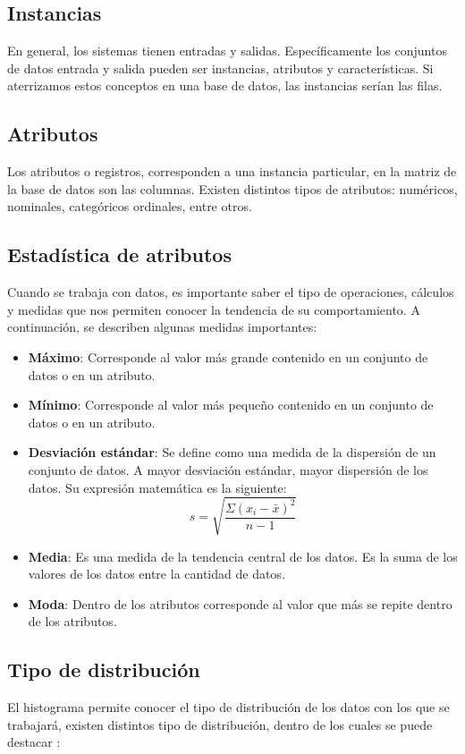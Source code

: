 \subsection{Instancias}
En general, los sistemas tienen entradas y salidas.  Específicamente los conjuntos de datos entrada y salida pueden ser instancias, atributos y características. Si aterrizamos estos conceptos en una base de datos, las instancias serían las filas. \cite{Aceves2021}

\subsection{Atributos}
Los atributos o registros, corresponden a una instancia particular,  en la matriz de la base de datos son las columnas. Existen distintos tipos de atributos: numéricos, nominales, categóricos ordinales, entre otros.  \cite{Aceves2021}

\subsection{Estadística de atributos}
Cuando se trabaja con datos, es importante saber el tipo de operaciones, cálculos y medidas que nos permiten conocer la tendencia de su comportamiento. A continuación, se describen algunas medidas importantes: 

\begin{itemize}
	\item \textbf{Máximo}: Corresponde al valor más grande contenido en un conjunto de datos o en un atributo.
	\item \textbf{Mínimo}: Corresponde al valor más pequeño contenido en un conjunto de datos o en un atributo.
	\item \textbf{Desviación estándar}: Se define como una medida de la dispersión de un conjunto de datos. A mayor desviación estándar, mayor dispersión de los datos. Su expresión matemática es la siguiente:
	$$s=\sqrt{\frac{\Sigma(x_i-\bar{x})^2}{n-1}}$$
	\item \textbf{Media}: Es una medida de la tendencia central de los datos. Es la suma de los valores de los datos entre la cantidad de datos.
	\item \textbf{Moda}: Dentro de los atributos corresponde al valor  que más se repite dentro de los atributos.
\end{itemize}

\subsection{Tipo de distribución}
El histograma permite conocer el tipo de distribución de los datos con los que se trabajará, existen distintos tipo de distribución, dentro de los cuales se puede destacar \cite{Aceves2021}:

